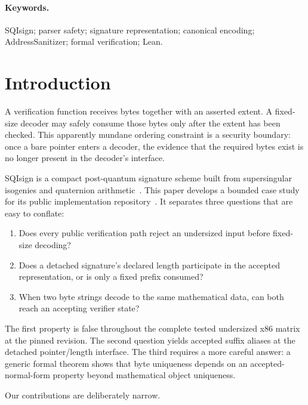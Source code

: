 \documentclass[11pt]{article}
\begin{document}
\paragraph{Keywords.}
SQIsign; parser safety; signature representation; canonical encoding;
AddressSanitizer; formal verification; Lean.

\section{Introduction}

A verification function receives bytes together with an asserted extent.  A
fixed-size decoder may safely consume those bytes only after the extent has
been checked.  This apparently mundane ordering constraint is a security
boundary: once a bare pointer enters a decoder, the evidence that the required
bytes exist is no longer present in the decoder's interface.

SQIsign is a compact post-quantum signature scheme built from supersingular
isogenies and quaternion arithmetic~\cite{sqisign-paper}.  This paper develops
a bounded case study for its public implementation
repository~\cite{sqisign-implementation}.  It separates three questions that
are easy to conflate:

\begin{enumerate}
  \item Does every public verification path reject an undersized input before
        fixed-size decoding?
  \item Does a detached signature's declared length participate in the
        accepted representation, or is only a fixed prefix consumed?
  \item When two byte strings decode to the same mathematical data, can both
        reach an accepting verifier state?
\end{enumerate}

The first property is false throughout the complete tested undersized x86
matrix at the pinned revision.  The second question yields accepted suffix
aliases at the detached pointer/length interface.  The third requires a more
careful answer: a generic formal theorem shows that byte uniqueness depends on
an accepted-normal-form property beyond mathematical object uniqueness.

Our contributions are deliberately narrow.
\end{document}

